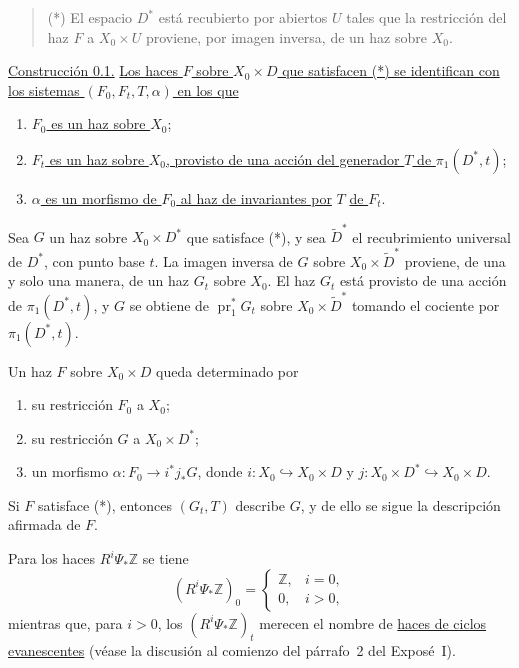 \begin{quote}
(*) El espacio $D^*$ está recubierto por abiertos $U$ tales que la
restricción del haz $F$ a $X_0\times U$ proviene, por imagen inversa, de un
haz sobre $X_0$.
\end{quote}

\medskip
\noindent\underline{Construcción 0.1.}\quad
\underline{Los haces $F$ sobre $X_0\times D$ que satisfacen (*) se
identifican con los sistemas $(F_0,F_t,T,\alpha)$ en los que}
\begin{enumerate}[label=\alph*),leftmargin=2.5em]
\item \underline{$F_0$ es un haz sobre $X_0$};
\item \underline{$F_t$ es un haz sobre $X_0$, provisto de una acción del
generador $T$ de $\pi_1(D^*,t)$};
\item \underline{$\alpha$ es un morfismo de $F_0$ al haz de invariantes por}
$T$ \underline{de $F_t$}.
\end{enumerate}

Sea $G$ un haz sobre $X_0\times D^*$ que satisface (*), y sea
$\widetilde D^*$ el recubrimiento universal de $D^*$, con punto base $t$.
La imagen inversa de $G$ sobre $X_0\times\widetilde D^*$ proviene, de una y
solo una manera, de un haz $G_t$ sobre $X_0$. El haz $G_t$ está provisto de
una acción de $\pi_1(D^*,t)$, y $G$ se obtiene de
$\operatorname{pr}_1^*G_t$ sobre $X_0\times\widetilde D^*$ tomando el
cociente por $\pi_1(D^*,t)$.

Un haz $F$ sobre $X_0\times D$ queda determinado por
\begin{enumerate}[label=\arabic*),leftmargin=2.5em]
\item su restricción $F_0$ a $X_0$;
\item su restricción $G$ a $X_0\times D^*$;
\item un morfismo $\alpha:F_0\longrightarrow i^*j_*G$, donde
$i:X_0\hookrightarrow X_0\times D$ y
$j:X_0\times D^*\hookrightarrow X_0\times D$.
\end{enumerate}
Si $F$ satisface (*), entonces $(G_t,T)$ describe $G$, y de ello se sigue la
descripción afirmada de $F$.

Para los haces $R^i\Psi_*\mathbb Z$ se tiene
\begin{equation*}
(R^i\Psi_*\mathbb Z)_0=
\begin{cases}
\mathbb Z, & i=0,\\
0, & i>0,
\end{cases}
\end{equation*}
mientras que, para $i>0$, los $(R^i\Psi_*\mathbb Z)_t$ merecen el nombre de
\underline{haces de ciclos evanescentes} (véase la discusión al comienzo del
párrafo~2 del Exposé~I).


